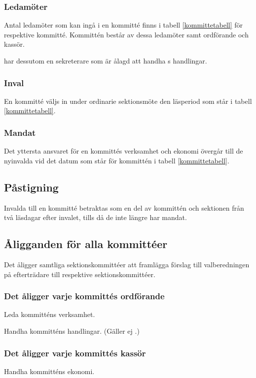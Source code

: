 \subsubsection{Ledamöter} \label{ledmot}
Antal ledamöter som kan ingå i en kommitté finns i tabell \ref{kommittetabell} för respektive kommitté. Kommittén består av dessa ledamöter samt ordförande och kassör. 

\ARMIT{} har dessutom en sekreterare som är ålagd att handha \ARMIT{}s handlingar. 

\subsubsection{Inval}
En kommitté väljs in under ordinarie sektionsmöte den läsperiod som står i tabell \ref{kommittetabell}. 

\subsubsection{Mandat} \label{mandat}
Det yttersta ansvaret för en kommittés verksamhet och ekonomi övergår till de nyinvalda vid det datum som står för kommittén i tabell \ref{kommittetabell}.

\subsection{Påstigning}

Invalda till en kommitté betraktas som en del av kommittén och sektionen från två läsdagar efter invalet, tills då de inte längre har mandat.

\subsection{Åligganden för alla kommittéer}
Det åligger samtliga sektionskommittéer att framlägga förslag till valberedningen på efterträdare till respektive sektionskommittéer. 

\subsubsection{Det åligger varje kommittés ordförande}
\begin{att}
	\item Leda kommitténs verksamhet.
	\item Handha kommitténs handlingar. (Gäller ej \ARMIT{}.)
\end{att}

\subsubsection{Det åligger varje kommittés kassör}
\begin{att}
	\item Handha kommitténs ekonomi.
\end{att}

